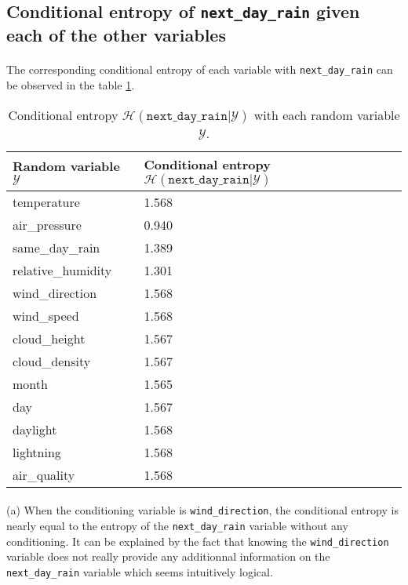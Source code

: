 \documentclass[a4paper, 11pt, oneside]{article}
\begin{document}
\subsection{Conditional entropy of \texttt{next\_day\_rain} given each of the other variables}

\paragraph{}The corresponding conditional entropy of each variable with \texttt{next\_day\_rain} can be observed in the table \ref{table:q7}.

\begin{table}[H]
    \centering
    \begin{tabular}{|l|l|}
    \hline
    \textbf{Random variable $\mathcal{Y}$} & \textbf{Conditional entropy $\mathcal{H}(\texttt{next\_day\_rain} | \mathcal{Y})$} \\ \hline
    temperature            & 1.568           \\ \hline
    air\_pressure          & 0.940          \\ \hline
    same\_day\_rain        & 1.389          \\ \hline
    relative\_humidity     & 1.301        \\ \hline
    wind\_direction        & 1.568            \\ \hline
    wind\_speed            & 1.568             \\ \hline
    cloud\_height          & 1.567             \\ \hline
    cloud\_density         & 1.567            \\ \hline
    month                  & 1.565           \\ \hline
    day                    & 1.567           \\ \hline
    daylight               & 1.568             \\ \hline
    lightning              & 1.568             \\ \hline
    air\_quality           & 1.568            \\ \hline
    \end{tabular}
    \caption{Conditional entropy $\mathcal{H}(\texttt{next\_day\_rain} | \mathcal{Y})$ with each random variable $\mathcal{Y}$.}
    \label{table:q7}
    \end{table}


\paragraph{}(a) When the conditioning variable is \texttt{wind\_direction}, the conditional entropy is nearly equal to the entropy of the \texttt{next\_day\_rain} variable without any conditioning.
It can be explained by the fact that knowing the \texttt{wind\_direction} variable does not really provide any additionnal information on the \texttt{next\_day\_rain} variable which seems intuitively logical.
\end{document}
